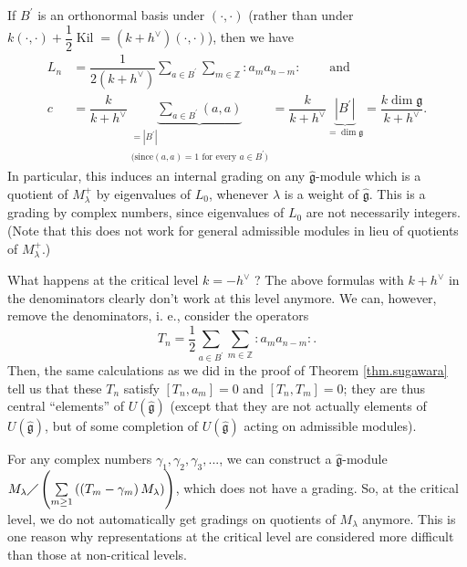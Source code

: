 \documentclass[etingof-lie.tex]{subfiles}
\begin{document}
If $B^{\prime}$ is an orthonormal basis under $\left(  \cdot,\cdot\right)  $
(rather than under $k\left(  \cdot,\cdot\right)  +\dfrac{1}{2}%
\operatorname*{Kil}=\left(  k+h^{\vee}\right)  \left(  \cdot,\cdot\right)  $),
then we have%
\begin{align}
L_{n}  &  =\dfrac{1}{2\left(  k+h^{\vee}\right)  }\sum\limits_{a\in B^{\prime
}}\sum\limits_{m\in\mathbb{Z}}\left.  :a_{m}a_{n-m}:\right.
\ \ \ \ \ \ \ \ \ \ \text{and}\nonumber\\
c  &  =\dfrac{k}{k+h^{\vee}}\underbrace{\sum\limits_{a\in B^{\prime}}\left(
a,a\right)  }_{\substack{=\left\vert B^{\prime}\right\vert \\\text{(since
}\left(  a,a\right)  =1\text{ for every }a\in B^{\prime}\text{)}}}=\dfrac
{k}{k+h^{\vee}}\underbrace{\left\vert B^{\prime}\right\vert }_{=\dim
\mathfrak{g}}=\dfrac{k\dim\mathfrak{g}}{k+h^{\vee}}.
\label{thm.sugawara.simple.c}%
\end{align}
In particular, this induces an internal grading on any $\widehat{\mathfrak{g}%
}$-module which is a quotient of $M_{\lambda}^{+}$ by eigenvalues of $L_{0}$,
whenever $\lambda$ is a weight of $\widehat{\mathfrak{g}}$. This is a grading
by complex numbers, since eigenvalues of $L_{0}$ are not necessarily integers.
(Note that this does not work for general admissible modules in lieu of
quotients of $M_{\lambda}^{+}$.)

What happens at the critical level $k=-h^{\vee}$ ? The above formulas with
$k+h^{\vee}$ in the denominators clearly don't work at this level anymore. We
can, however, remove the denominators, i. e., consider the operators%
\[
T_{n}=\dfrac{1}{2}\sum\limits_{a\in B^{\prime}}\sum\limits_{m\in\mathbb{Z}%
}\left.  :a_{m}a_{n-m}:\right.  .
\]
Then, the same calculations as we did in the proof of Theorem
\ref{thm.sugawara} tell us that these $T_{n}$ satisfy $\left[  T_{n}%
,a_{m}\right]  =0$ and $\left[  T_{n},T_{m}\right]  =0$; they are thus central
``elements'' of $U\left(  \widehat{\mathfrak{g}}\right)  $ (except that they
are not actually elements of $U\left(  \widehat{\mathfrak{g}}\right)  $, but
of some completion of $U\left(  \widehat{\mathfrak{g}}\right)  $ acting on
admissible modules).

For any complex numbers $\gamma_{1},\gamma_{2},\gamma_{3},...$, we can
construct a $\widehat{\mathfrak{g}}$-module $M_{\lambda}\diagup\left(
\sum\limits_{m\geq1}\left(  \left(  T_{m}-\gamma_{m}\right)  M_{\lambda
}\right)  \right)  $, which does not have a grading. So, at the critical
level, we do not automatically get gradings on quotients of $M_{\lambda}$
anymore. This is one reason why representations at the critical level are
considered more difficult than those at non-critical levels.
\end{document}
